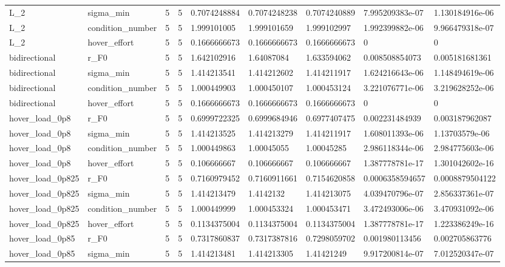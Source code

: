 \begin{tabular}{@{}lllllllll@{}}
L\_2 & sigma\_min & 5 & 5 & 0.7074248884 & 0.7074248238 & 0.7074240889 & 7.995209383e-07 & 1.130184916e-06 \\
L\_2 & condition\_number & 5 & 5 & 1.999101005 & 1.999101659 & 1.999102997 & 1.992399882e-06 & 9.966479318e-07 \\
L\_2 & hover\_effort & 5 & 5 & 0.1666666673 & 0.1666666673 & 0.1666666673 & 0 & 0 \\
bidirectional & r\_F0 & 5 & 5 & 1.642102916 & 1.64087084 & 1.633594062 & 0.008508854073 & 0.005181681361 \\
bidirectional & sigma\_min & 5 & 5 & 1.414213541 & 1.414212602 & 1.414211917 & 1.624216643e-06 & 1.148494619e-06 \\
bidirectional & condition\_number & 5 & 5 & 1.000449903 & 1.000450107 & 1.000453124 & 3.221076771e-06 & 3.219628252e-06 \\
bidirectional & hover\_effort & 5 & 5 & 0.1666666673 & 0.1666666673 & 0.1666666673 & 0 & 0 \\
hover\_load\_0p8 & r\_F0 & 5 & 5 & 0.6999722325 & 0.6999684946 & 0.6977407475 & 0.002231484939 & 0.003187962087 \\
hover\_load\_0p8 & sigma\_min & 5 & 5 & 1.414213525 & 1.414213279 & 1.414211917 & 1.608011393e-06 & 1.13703579e-06 \\
hover\_load\_0p8 & condition\_number & 5 & 5 & 1.000449863 & 1.00045055 & 1.00045285 & 2.986118344e-06 & 2.984775603e-06 \\
hover\_load\_0p8 & hover\_effort & 5 & 5 & 0.106666667 & 0.106666667 & 0.106666667 & 1.387778781e-17 & 1.301042602e-16 \\
hover\_load\_0p825 & r\_F0 & 5 & 5 & 0.7160979452 & 0.7160911661 & 0.7154620858 & 0.0006358594657 & 0.0008879504122 \\
hover\_load\_0p825 & sigma\_min & 5 & 5 & 1.414213479 & 1.4142132 & 1.414213075 & 4.039470796e-07 & 2.856337361e-07 \\
hover\_load\_0p825 & condition\_number & 5 & 5 & 1.000449999 & 1.000453324 & 1.000453471 & 3.472493006e-06 & 3.470931092e-06 \\
hover\_load\_0p825 & hover\_effort & 5 & 5 & 0.1134375004 & 0.1134375004 & 0.1134375004 & 1.387778781e-17 & 1.223386249e-16 \\
hover\_load\_0p85 & r\_F0 & 5 & 5 & 0.7317860837 & 0.7317387816 & 0.7298059702 & 0.001980113456 & 0.002705863776 \\
hover\_load\_0p85 & sigma\_min & 5 & 5 & 1.414213481 & 1.414213305 & 1.41421249 & 9.917200814e-07 & 7.012520347e-07 \\

\end{tabular}
